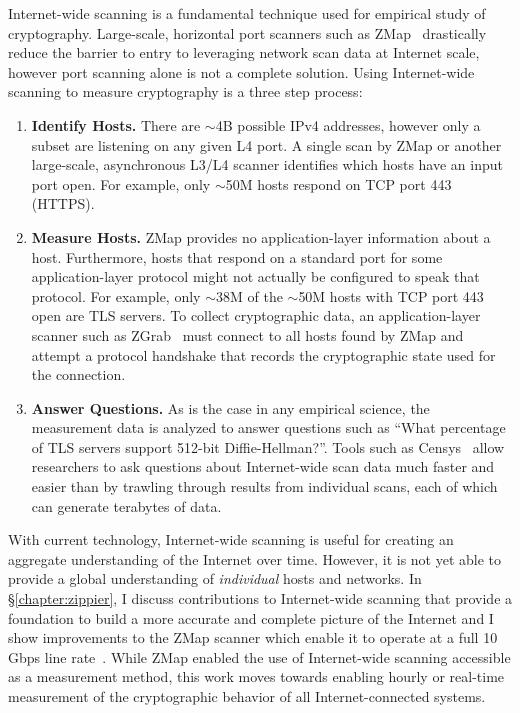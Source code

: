 Internet-wide scanning is a fundamental technique used for empirical study of
cryptography. Large-scale, horizontal port scanners such as
ZMap~\cite{zmap-2013} drastically reduce the barrier to entry to leveraging
network scan data at Internet scale, however port scanning alone is not a
complete solution. Using Internet-wide scanning to measure cryptography is a
three step process:
\begin{enumerate}
  \item \textbf{Identify Hosts.}
    There are $\sim$4B possible IPv4 addresses, however only a subset are
    listening on any given L4 port. A single scan by ZMap or another
    large-scale, asynchronous L3/L4 scanner identifies which hosts have an
    input port open. For example, only $\sim$50M hosts respond on TCP port 443
    (HTTPS).
  \item \textbf{Measure Hosts.}
    ZMap provides no application-layer information about a host. Furthermore,
    hosts that respond on a standard port for some application-layer protocol
    might not actually be configured to speak that protocol. For example,
    only $\sim$38M of the $\sim$50M hosts with TCP port 443 open are TLS
    servers. To collect cryptographic data, an application-layer scanner such
    as ZGrab~\cite{zgrab-github} must connect to all hosts found by ZMap and
    attempt a protocol handshake that records the cryptographic state used
    for the connection.
  \item \textbf{Answer Questions.}
    As is the case in any empirical science, the measurement data is analyzed
    to answer questions such as ``What percentage of TLS servers support
    512-bit Diffie-Hellman?''. Tools such as Censys~\cite{censys} allow
    researchers to ask questions about Internet-wide scan data much faster
    and easier than by trawling through results from individual scans, each
    of which can generate terabytes of data.
\end{enumerate}

With current technology, Internet-wide scanning is useful for creating an
aggregate understanding of the Internet over time. However, it is not yet
able to provide a global understanding of \textit{individual} hosts and
networks. In \S\ref{chapter:zippier}, I discuss contributions to
Internet-wide scanning that provide a foundation to build a more accurate and
complete picture of the Internet and I show improvements to the ZMap scanner
which enable it to operate at a full 10\,Gbps line
rate~\cite{zippier-zmap-2014}. While ZMap enabled the use of Internet-wide
scanning accessible as a measurement method, this work moves towards enabling
hourly or real-time measurement of the cryptographic behavior of all
Internet-connected systems.

